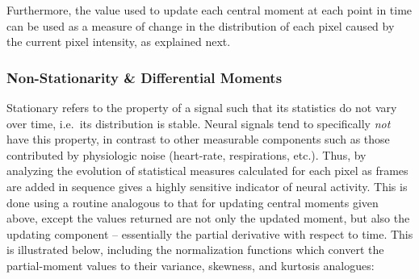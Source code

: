 \begin{Shaded}
\end{Shaded}

Furthermore, the value used to update each central moment at each point
in time can be used as a measure of change in the distribution of each
pixel caused by the current pixel intensity, as explained next.

\subsubsection{Non-Stationarity \& Differential
Moments}\label{non-stationarity-differential-moments}

Stationary refers to the property of a signal such that its statistics
do not vary over time, i.e.~its distribution is stable. Neural signals
tend to specifically \emph{not} have this property, in contrast to other
measurable components such as those contributed by physiologic noise
(heart-rate, respirations, etc.). Thus, by analyzing the evolution of
statistical measures calculated for each pixel as frames are added in
sequence gives a highly sensitive indicator of neural activity. This is
done using a routine analogous to that for updating central moments
given above, except the values returned are not only the updated moment,
but also the updating component -- essentially the partial derivative
with respect to time. This is illustrated below, including the
normalization functions which convert the partial-moment values to their
variance, skewness, and kurtosis analogues:


